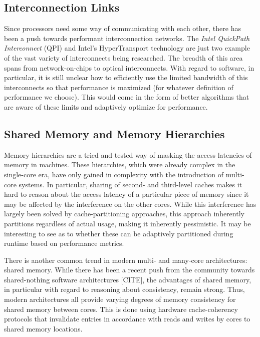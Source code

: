 \subsection{Interconnection Links}

Since processors need some way of communicating with each other, there has been a push
towards performant interconnection networks. The \emph{Intel QuickPath Interconnect} (QPI) and 
Intel's HyperTransport technology are just two example of the vast variety of interconnects
being researched. The breadth of this area spans from network-on-chips to optical interconnects.
With regard to software, in particular, it is still unclear how to efficiently use the limited bandwidth
of this interconnects so that performance is maximized (for whatever definition of performance we
choose). This would come in the form of better algorithms that are aware of these limits and
adaptively optimize for performance.

\subsection{Shared Memory and Memory Hierarchies}

Memory hierarchies are a tried and tested way of masking the access latencies of memory in machines.
These hierarchies, which were already complex in the single-core era, have only gained in complexity
with the introduction of multi-core systems. In particular, sharing of second- and third-level caches makes
it hard to reason about the access latency of a particular piece of memory since it may be affected by the
interference on the other cores. While this interference has largely been solved by cache-partitioning
approaches, this approach inherently partitions regardless of actual usage, making it inherently pessimistic.
It may be interesting to see as to whether these can be adaptively partitioned during runtime based on
performance metrics.

There is another common trend in modern multi- and many-core architectures: shared memory. While there
has been a recent push from the community towards shared-nothing software architectures [CITE], the
advantages of shared memory, in particular with regard to reasoning about consistency, remain strong.
Thus, modern architectures all provide varying degrees of memory consistency for shared memory between
cores. This is done using hardware cache-coherency protocols that invalidate entries in accordance with
reads and writes by cores to shared memory locations.

